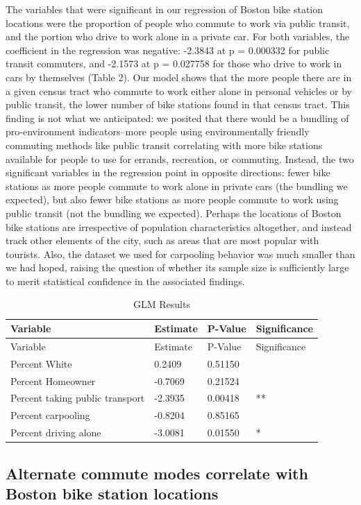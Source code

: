 \documentclass[
  12pt,
]{article}
\begin{document}
The variables that were significant in our regression of Boston bike
station locations were the proportion of people who commute to work via
public transit, and the portion who drive to work alone in a private
car. For both variables, the coefficient in the regression was negative:
-2.3843 at p = 0.000332 for public transit commuters, and -2.1573 at p =
0.027758 for those who drive to work in cars by themselves (Table 2).
Our model shows that the more people there are in a given census tract
who commute to work either alone in personal vehicles or by public
transit, the lower number of bike stations found in that census tract.
This finding is not what we anticipated: we posited that there would be
a bundling of pro-environment indicators--more people using
environmentally friendly commuting methods like public transit
correlating with more bike stations available for people to use for
errands, recreation, or commuting. Instead, the two significant
variables in the regression point in opposite directions: fewer bike
stations as more people commute to work alone in private cars (the
bundling we expected), but also fewer bike stations as more people
commute to work using public transit (not the bundling we expected).
Perhaps the locations of Boston bike stations are irrespective of
population characteristics altogether, and instead track other elements
of the city, such as areas that are most popular with tourists. Also,
the dataset we used for carpooling behavior was much smaller than we had
hoped, raising the question of whether its sample size is sufficiently
large to merit statistical confidence in the associated findings.

\begin{longtable}[]{@{}llll@{}}
\caption{GLM Results}\tabularnewline
\toprule
Variable & Estimate & P-Value & Significance \\
\midrule
\endfirsthead
\toprule
Variable & Estimate & P-Value & Significance \\
\midrule
\endhead
Percent White & 0.2409 & 0.51150 & \\
Percent Homeowner & -0.7069 & 0.21524 & \\
Percent taking public transport & -2.3935 & 0.00418 & ** \\
Percent carpooling & -0.8204 & 0.85165 & \\
Percent driving alone & -3.0081 & 0.01550 & * \\
\bottomrule
\end{longtable}

\hypertarget{alternate-commute-modes-correlate-with-boston-bike-station-locations}{%
\subsection{Alternate commute modes correlate with Boston bike station
locations}\label{alternate-commute-modes-correlate-with-boston-bike-station-locations}}
\end{document}
